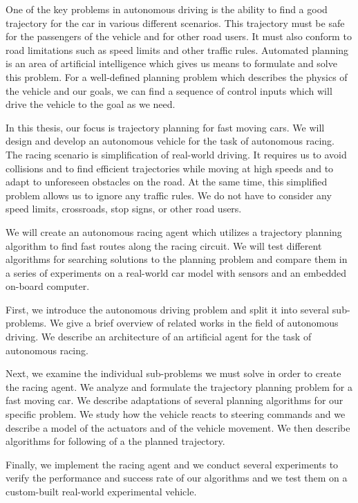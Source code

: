 One of the key problems in autonomous driving is the ability to find a good trajectory for the car in various different scenarios. This trajectory must be safe for the passengers of the vehicle and for other road users. It must also conform to road limitations such as speed limits and other traffic rules. Automated planning is an area of artificial intelligence which gives us means to formulate and solve this problem. For a well-defined planning problem which describes the physics of the vehicle and our goals, we can find a sequence of control inputs which will drive the vehicle to the goal as we need.

In this thesis, our focus is trajectory planning for fast moving cars. We will design and develop an autonomous vehicle for the task of autonomous racing. The racing scenario is simplification of real-world driving. It requires us to avoid collisions and to find efficient trajectories while moving at high speeds and to adapt to unforeseen obstacles on the road. At the same time, this simplified problem allows us to ignore any traffic rules. We do not have to consider any speed limits, crossroads, stop signs, or other road users.

We will create an autonomous racing agent which utilizes a trajectory planning algorithm to find fast routes along the racing circuit. We will test different algorithms for searching solutions to the planning problem and compare them in a series of experiments on a real-world car model with sensors and an embedded on-board computer.

First, we introduce the autonomous driving problem and split it into several sub-problems. We give a brief overview of related works in the field of autonomous driving. We describe an architecture of an artificial agent for the task of autonomous racing.

Next, we examine the individual sub-problems we must solve in order to create the racing agent. We analyze and formulate the trajectory planning problem for a fast moving car. We describe adaptations of several planning algorithms for our specific problem. We study how the vehicle reacts to steering commands and we describe a model of the actuators and of the vehicle movement. We then describe algorithms for following of a the planned trajectory.

Finally, we implement the racing agent and we conduct several experiments to verify the performance and success rate of our algorithms and we test them on a custom-built real-world experimental vehicle.
